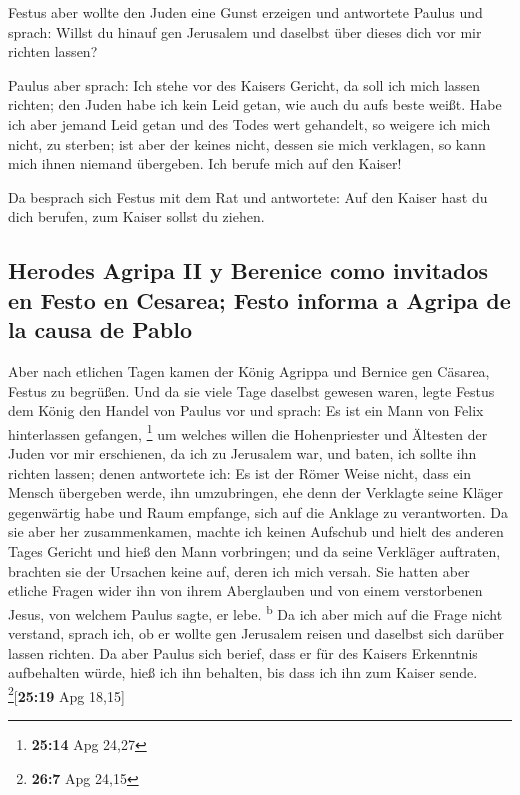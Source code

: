  Festus aber wollte den Juden eine Gunst erzeigen und
antwortete Paulus und sprach: Willst du hinauf gen Jerusalem und
daselbst über dieses dich vor mir richten lassen?

 Paulus aber sprach: Ich stehe vor des Kaisers Gericht,
da soll ich mich lassen richten; den Juden habe ich kein Leid getan, wie
auch du aufs beste weißt.  Habe ich aber jemand Leid
getan und des Todes wert gehandelt, so weigere ich mich nicht, zu
sterben; ist aber der keines nicht, dessen sie mich verklagen, so kann
mich ihnen niemand übergeben. Ich berufe mich auf den Kaiser!

 Da besprach sich Festus mit dem Rat und antwortete: Auf
den Kaiser hast du dich berufen, zum Kaiser sollst du ziehen.

\hypertarget{herodes-agripa-ii-y-berenice-como-invitados-en-festo-en-cesarea-festo-informa-a-agripa-de-la-causa-de-pablo}{%
\subsection{Herodes Agripa II y Berenice como invitados en Festo en
Cesarea; Festo informa a Agripa de la causa de
Pablo}\label{herodes-agripa-ii-y-berenice-como-invitados-en-festo-en-cesarea-festo-informa-a-agripa-de-la-causa-de-pablo}}

 Aber nach etlichen Tagen kamen der König Agrippa und
Bernice gen Cäsarea, Festus zu begrüßen.  Und da sie
viele Tage daselbst gewesen waren, legte Festus dem König den Handel von
Paulus vor und sprach: Es ist ein Mann von Felix hinterlassen gefangen,
\footnote{\textbf{25:14} Apg 24,27}  um welches willen
die Hohenpriester und Ältesten der Juden vor mir erschienen, da ich zu
Jerusalem war, und baten, ich sollte ihn richten lassen; 
denen antwortete ich: Es ist der Römer Weise nicht, dass ein Mensch
übergeben werde, ihn umzubringen, ehe denn der Verklagte seine Kläger
gegenwärtig habe und Raum empfange, sich auf die Anklage zu
verantworten.  Da sie aber her zusammenkamen, machte ich
keinen Aufschub und hielt des anderen Tages Gericht und hieß den Mann
vorbringen;  und da seine Verkläger auftraten, brachten
sie der Ursachen keine auf, deren ich mich versah.  Sie
hatten aber etliche Fragen wider ihn von ihrem Aberglauben und von einem
verstorbenen Jesus, von welchem Paulus sagte, er lebe.
\textsuperscript{b}  Da ich aber mich auf die Frage nicht
verstand, sprach ich, ob er wollte gen Jerusalem reisen und daselbst
sich darüber lassen richten.  Da aber Paulus sich berief,
dass er für des Kaisers Erkenntnis aufbehalten würde, hieß ich ihn
behalten, bis dass ich ihn zum Kaiser sende.
\footnote{\textbf{26:7} Apg 24,15}{[}\textbf{25:19} Apg 18,15{]}

